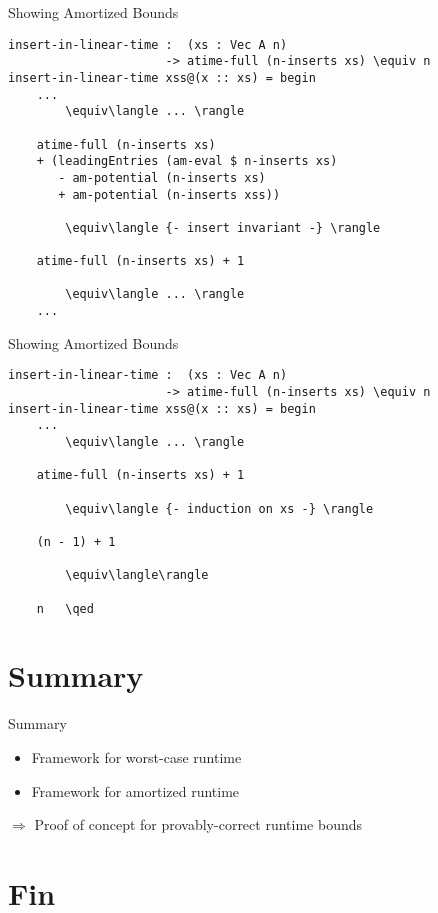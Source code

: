 \documentclass[11pt]{beamer}
\begin{document}
    \begin{frame}[fragile]{Showing Amortized Bounds}
        \begin{lstlisting}[emph={insert,in,linear,time}]
insert-in-linear-time :  (xs : Vec A n)
                      -> atime-full (n-inserts xs) \equiv n
insert-in-linear-time xss@(x :: xs) = begin
    ...
        \equiv\langle ... \rangle

    atime-full (n-inserts xs)
    + (leadingEntries (am-eval $ n-inserts xs)
       - am-potential (n-inserts xs)
       + am-potential (n-inserts xss))

        \equiv\langle {- insert invariant -} \rangle

    atime-full (n-inserts xs) + 1

        \equiv\langle ... \rangle
    ...
        \end{lstlisting}
    \end{frame}

    \begin{frame}[fragile]{Showing Amortized Bounds}
        \begin{lstlisting}[emph={insert,in,linear,time}]
insert-in-linear-time :  (xs : Vec A n)
                      -> atime-full (n-inserts xs) \equiv n
insert-in-linear-time xss@(x :: xs) = begin
    ...
        \equiv\langle ... \rangle

    atime-full (n-inserts xs) + 1

        \equiv\langle {- induction on xs -} \rangle

    (n - 1) + 1

        \equiv\langle\rangle

    n   \qed
        \end{lstlisting}
    \end{frame}

\section{Summary}
    \begin{frame}{Summary}
        \begin{itemize}
            \item[\usebeamertemplate{itemize item}] Framework for worst-case runtime
            \item[\usebeamertemplate{itemize item}] Framework for amortized runtime
        \end{itemize}
        $\Rightarrow$ Proof of concept for provably-correct runtime bounds
    \end{frame}

\section{Fin}
\end{document}
